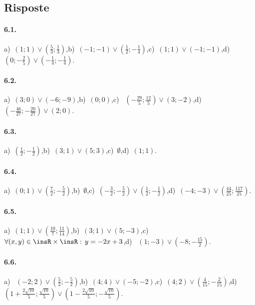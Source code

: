 \subsection{Risposte}
\paragraph{6.1.} a)~$\left(1;1\right)\vee \left(\frac 5 3;\frac 1 3\right)$,\quad b)~$\left(-1;-1\right)\vee \left(\frac 1 2;-\frac 1 4\right)$,\quad c)~$\left(1;1\right)\vee \left(-1;-1\right)$,\quad d)~$\left(0;-\frac 2 5\right)\vee \left(-\frac 1 4;-\frac 1 4\right)$.

\paragraph{6.2.} a)~$\left(3;0\right)\vee \left(-6;-9\right)$,\quad b)~$\left(0;0\right)$,\quad c)~ $\left(-\frac{29} 5;\frac{12} 5\right)\vee (3;-2)$,\quad d)~$\left(-\frac{46}{27};-\frac{20}{27}\right)\vee (2;0)$.

\paragraph{6.3.} a)~$\left(\frac 1 2;-\frac 1 2\right)$,\quad b)~$\left(3;1\right)\vee \left(5;3\right)$,\quad c)~$\emptyset $,\quad d)~$\left(1;1\right)$.

\paragraph{6.4.} a)~$\left(0;1\right)\vee \left(\frac 7 2;-\frac 5 2\right)$,\quad b)~$\emptyset $,\quad c)~$\left(-\frac 3 2;-\frac 5 2\right)\vee \left(\frac 1 2;-\frac 1 2\right)$,\quad d)~$\left(-4;-3\right)\vee \left(\frac{44}{25};\frac{117}{25}\right)$.

\paragraph{6.5.} a)~$\left(1;1\right)\vee \left(\frac{10} 7;\frac{11}{14}\right)$,\quad b)~$\left(3;1\right)\vee \left(5;-3\right)$,\quad c)~$ \forall (x,y)\in \insR \times \insR:\,y=-2x+3$,\quad d)~ $\left(1;-3\right)\vee \left(-8;-\frac{15} 2\right)$.

\paragraph{6.6.} a)~ $\left(-2;2\right)\vee \left(\frac 5 2;-\frac 5 2\right)$,\quad b)~$\left(4;4\right)\vee \left(-5;-2\right)$,\quad c)~$\left(4;2\right)\vee \left(\frac 4{15};-\frac 2{15}\right)$,\quad d)~$\left(1+\frac{2\sqrt{10}} 5;\frac{\sqrt{10}} 5\right)\vee \left(1-\frac{2\sqrt{10}} 5;-\frac{\sqrt{10}} 5\right)$.

